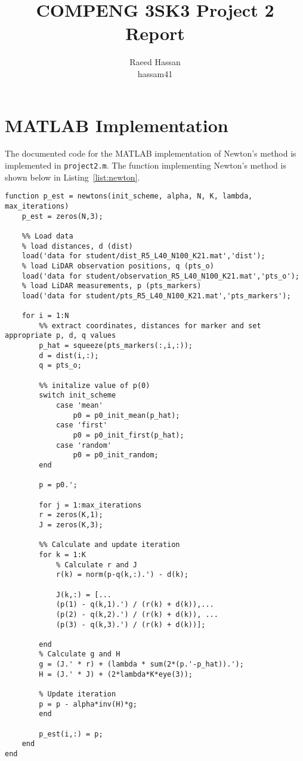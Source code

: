 \documentclass[12pt]{article}
\title{COMPENG 3SK3 Project 2 Report}
\author{
    Raeed Hassan \\
    hassam41 \\
}
\begin{document}
\maketitle
\clearpage

\section*{MATLAB Implementation}
The documented code for the MATLAB implementation of Newton's method is implemented in \texttt{project2.m}. The function implementing Newton's method is shown below in Listing~\ref{list:newton}.

\begin{lstlisting}[style=Matlab-editor, caption={MATLAB Implementation of Newton's Method}, label={list:newton}]
%% Implement the Newton's method based denoising algorithm
function p_est = newtons(init_scheme, alpha, N, K, lambda, max_iterations)
    p_est = zeros(N,3);

    %% Load data
    % load distances, d (dist)
    load('data for student/dist_R5_L40_N100_K21.mat','dist');
    % load LiDAR observation positions, q (pts_o)
    load('data for student/observation_R5_L40_N100_K21.mat','pts_o');
    % load LiDAR measurements, p (pts_markers)
    load('data for student/pts_R5_L40_N100_K21.mat','pts_markers');

    for i = 1:N
        %% extract coordinates, distances for marker and set appropriate p, d, q values
        p_hat = squeeze(pts_markers(:,i,:));
        d = dist(i,:);
        q = pts_o;

        %% initalize value of p(0)
        switch init_scheme
            case 'mean'
                p0 = p0_init_mean(p_hat);
            case 'first'
                p0 = p0_init_first(p_hat);
            case 'random'
                p0 = p0_init_random;
        end
        
        p = p0.';

        for j = 1:max_iterations
        r = zeros(K,1);
        J = zeros(K,3);

        %% Calculate and update iteration
        for k = 1:K
            % Calculate r and J
            r(k) = norm(p-q(k,:).') - d(k);
            
            J(k,:) = [...
            (p(1) - q(k,1).') / (r(k) + d(k)),...
            (p(2) - q(k,2).') / (r(k) + d(k)), ...
            (p(3) - q(k,3).') / (r(k) + d(k))];

        end
        % Calculate g and H
        g = (J.' * r) + (lambda * sum(2*(p.'-p_hat)).');
        H = (J.' * J) + (2*lambda*K*eye(3));

        % Update iteration
        p = p - alpha*inv(H)*g;
        end

        p_est(i,:) = p;
    end
end
\end{lstlisting}
\end{document}
